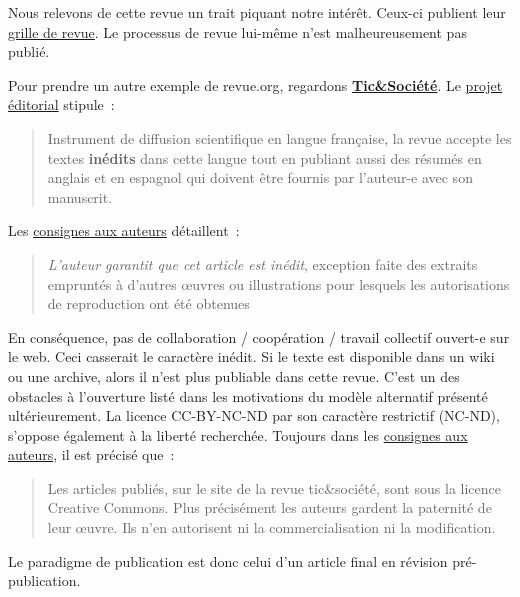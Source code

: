 Nous relevons de cette revue un trait piquant notre intérêt.
Ceux-ci publient leur \href{http://vertigo.revues.org/5427?file=1}{grille de revue}.
Le processus de revue lui-même n'est malheureusement pas publié.

{%
%
%
%
%
%
}
Pour prendre un autre exemple de revue.org, regardons \textbf{\href{http://ticetsociete.revues.org}{Tic\&Société}}.
Le \href{http://ticetsociete.revues.org/564#tocto1n1}{projet éditorial} stipule~:
\blockcquote{_a_2014}{
Instrument de diffusion scientifique en langue française, la revue accepte les textes \textbf{inédits} dans cette langue tout en publiant aussi des résumés en anglais et en espagnol qui doivent être fournis par l’auteur-e avec son manuscrit.}
Les \href{http://ticetsociete.revues.org/90}{consignes aux auteurs} détaillent~:
\blockcquote{_consignes_2008}{
\emph{L’auteur garantit que cet article est inédit}, exception faite des extraits empruntés à d’autres œuvres ou illustrations pour lesquels les autorisations de reproduction ont été obtenues}.
En conséquence, pas de collaboration / coopération / travail collectif ouvert-e sur le web.
Ceci casserait le caractère inédit.
Si le texte est disponible dans un wiki ou une archive, alors il n'est plus publiable dans cette revue.
C'est un des obstacles à l'ouverture listé dans les motivations du modèle alternatif présenté ultérieurement.
La licence CC-BY-NC-ND par son caractère restrictif (NC-ND), s'oppose également à la liberté recherchée.
Toujours dans les \href{http://ticetsociete.revues.org/90}{consignes aux auteurs}, il est précisé que~:
\blockcquote{_consignes_2008}{
Les articles publiés, sur le site de la revue tic\&société, sont sous la licence Creative Commons.
Plus précisément les auteurs gardent la paternité de leur œuvre.
Ils n’en autorisent ni la commercialisation ni la modification.
}
Le paradigme de publication est donc celui d'un article final en révision pré-publication.

